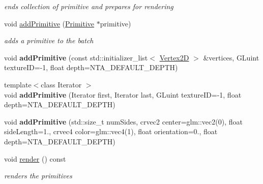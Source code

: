 \begin{DoxyCompactItemize}
\begin{DoxyCompactList}\small\item\em ends collection of primitive and prepares for rendering \end{DoxyCompactList}\item 
\mbox{\label{classnta_1_1PrimitiveBatch_a61a1fd06003233eac050ea7317fafc43}} 
void \hyperlink{classnta_1_1PrimitiveBatch_a61a1fd06003233eac050ea7317fafc43}{add\+Primitive} (\hyperlink{structnta_1_1Primitive}{Primitive} $\ast$primitive)
\begin{DoxyCompactList}\small\item\em adds a primitive to the batch \end{DoxyCompactList}\item 
\mbox{\label{classnta_1_1PrimitiveBatch_a3e27ba0adbccc7d83254ea1877025d05}} 
void {\bfseries add\+Primitive} (const std\+::initializer\+\_\+list$<$ \hyperlink{structnta_1_1Vertex2D}{Vertex2D} $>$ \&vertices, G\+Luint texture\+ID=-\/1, float depth=N\+T\+A\+\_\+\+D\+E\+F\+A\+U\+L\+T\+\_\+\+D\+E\+P\+TH)
\item 
\mbox{\label{classnta_1_1PrimitiveBatch_a632c197f0f3362d52ce8c0ff1e03745c}} 
{\footnotesize template$<$class Iterator $>$ }\\void {\bfseries add\+Primitive} (Iterator first, Iterator last, G\+Luint texture\+ID=-\/1, float depth=N\+T\+A\+\_\+\+D\+E\+F\+A\+U\+L\+T\+\_\+\+D\+E\+P\+TH)
\item 
\mbox{\label{classnta_1_1PrimitiveBatch_ac66007384a7932b1082c5d9baab8d836}} 
void {\bfseries add\+Primitive} (std\+::size\+\_\+t num\+Sides, crvec2 center=glm\+::vec2(0), float side\+Length=1., crvec4 color=glm\+::vec4(1), float orientation=0., float depth=N\+T\+A\+\_\+\+D\+E\+F\+A\+U\+L\+T\+\_\+\+D\+E\+P\+TH)
\item 
\mbox{\label{classnta_1_1PrimitiveBatch_a899411db2d7abc313d8bef4a19fd097e}} 
void \hyperlink{classnta_1_1PrimitiveBatch_a899411db2d7abc313d8bef4a19fd097e}{render} () const
\begin{DoxyCompactList}\small\item\em renders the primitives \end{DoxyCompactList}\end{DoxyCompactItemize}


